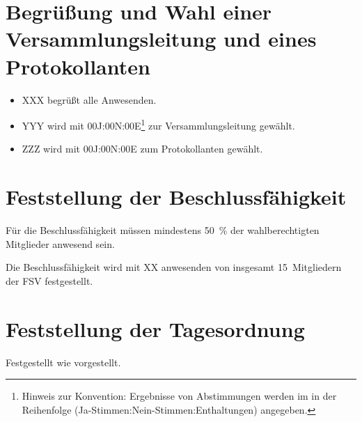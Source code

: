 \documentclass[sitzung=fsv-konstituierend]{fsphys-protokoll}
\begin{document}
	
\section{Begrüßung und Wahl einer Versammlungsleitung und eines Protokollanten}
\begin{itemize}
	\item XXX begrüßt alle Anwesenden.
	\item YYY wird mit 00J:00N:00E\footnote{Hinweis zur Konvention: Ergebnisse von Abstimmungen werden im in der Reihenfolge (Ja-Stimmen:Nein-Stimmen:Enthaltungen) angegeben.} zur Versammlungsleitung gewählt.
	\item ZZZ wird mit 00J:00N:00E zum Protokollanten gewählt.
\end{itemize}

\section{Feststellung der Beschlussfähigkeit}
Für die Beschlussfähigkeit müssen mindestens \SI{50}{\percent} der wahlberechtigten Mitglieder anwesend sein.

Die Beschlussfähigkeit wird mit XX anwesenden von insgesamt 15~Mitgliedern der FSV festgestellt.

\section{Feststellung der Tagesordnung}
Festgestellt wie vorgestellt.
\end{document}
